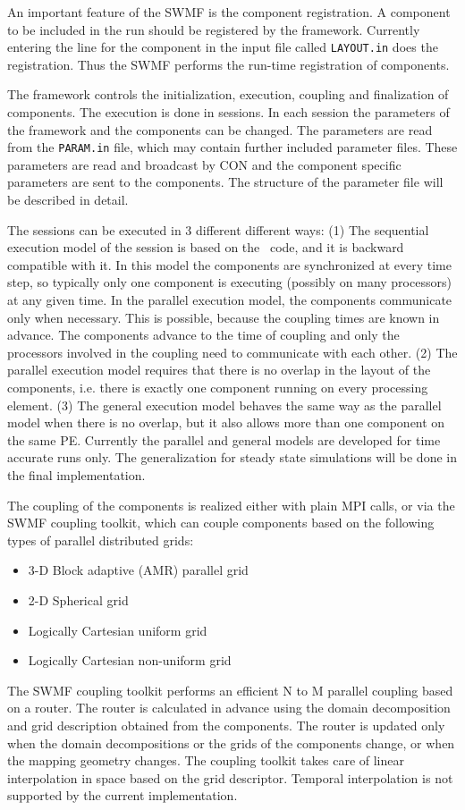 An important feature of the SWMF is the component registration.  A
component to be included in the run should be registered by the
framework.  Currently entering the line for the component in the input
file called {\tt LAYOUT.in} does the registration.  Thus the SWMF
performs the run-time registration of components.

The framework controls the initialization, execution, coupling and
finalization of components.  The execution is done in sessions. In
each session the parameters of the framework and the components can be
changed.  The parameters are read from the {\tt PARAM.in} file, which
may contain further included parameter files.  These parameters are
read and broadcast by CON and the component specific parameters are
sent to the components. The structure of the parameter file will be
described in detail.

The sessions can be executed in 3 different different ways: (1) The
sequential execution model of the session is based on the \BATSRUS\
code, and it is backward compatible with it. In this model the
components are synchronized at every time step, so typically only one
component is executing (possibly on many processors) at any given
time.  In the parallel execution model, the components communicate
only when necessary.  This is possible, because the coupling times are
known in advance.  The components advance to the time of coupling and
only the processors involved in the coupling need to communicate with
each other.  (2) The parallel execution model requires that there is
no overlap in the layout of the components, i.e. there is exactly one
component running on every processing element.  (3) The general
execution model behaves the same way as the parallel model when there
is no overlap, but it also allows more than one component on the same
PE. Currently the parallel and general models are developed for time
accurate runs only. The generalization for steady state simulations
will be done in the final implementation.

The coupling of the components is realized either with plain MPI
calls, or via the SWMF coupling toolkit, which can couple components
based on the following types of parallel distributed grids:
\begin{itemize}
\item 3-D Block adaptive (AMR) parallel grid
\item 2-D Spherical grid
\item Logically Cartesian uniform grid
\item Logically Cartesian non-uniform grid 
\end{itemize}
The SWMF coupling toolkit performs an efficient N to M parallel
coupling based on a router. The router is calculated in advance using
the domain decomposition and grid description obtained from the
components.  The router is updated only when the domain decompositions
or the grids of the components change, or when the mapping geometry
changes.  The coupling toolkit takes care of linear interpolation in
space based on the grid descriptor.  Temporal interpolation is not
supported by the current implementation.

